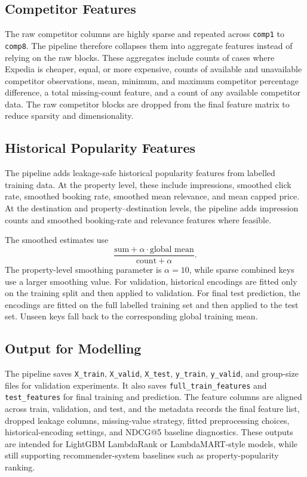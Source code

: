 \subsection{Competitor Features}

The raw competitor columns are highly sparse and repeated across \texttt{comp1} to \texttt{comp8}. The pipeline therefore collapses them into aggregate features instead of relying on the raw blocks. These aggregates include counts of cases where Expedia is cheaper, equal, or more expensive, counts of available and unavailable competitor observations, mean, minimum, and maximum competitor percentage difference, a total missing-count feature, and a count of any available competitor data. The raw competitor blocks are dropped from the final feature matrix to reduce sparsity and dimensionality.

\subsection{Historical Popularity Features}

The pipeline adds leakage-safe historical popularity features from labelled training data. At the property level, these include impressions, smoothed click rate, smoothed booking rate, smoothed mean relevance, and mean capped price. At the destination and property--destination levels, the pipeline adds impression counts and smoothed booking-rate and relevance features where feasible.

The smoothed estimates use
\[
\frac{\text{sum} + \alpha \cdot \text{global mean}}{\text{count} + \alpha}.
\]
The property-level smoothing parameter is \(\alpha=10\), while sparse combined keys use a larger smoothing value. For validation, historical encodings are fitted only on the training split and then applied to validation. For final test prediction, the encodings are fitted on the full labelled training set and then applied to the test set. Unseen keys fall back to the corresponding global training mean.

\subsection{Output for Modelling}

The pipeline saves \texttt{X\_train}, \texttt{X\_valid}, \texttt{X\_test}, \texttt{y\_train}, \texttt{y\_valid}, and group-size files for validation experiments. It also saves \texttt{full\_train\_features} and \texttt{test\_features} for final training and prediction. The feature columns are aligned across train, validation, and test, and the metadata records the final feature list, dropped leakage columns, missing-value strategy, fitted preprocessing choices, historical-encoding settings, and NDCG@5 baseline diagnostics. These outputs are intended for LightGBM LambdaRank or LambdaMART-style models, while still supporting recommender-system baselines such as property-popularity ranking.

